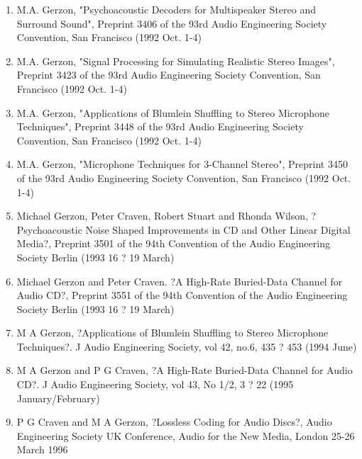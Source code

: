 \documentclass[9pt]{amsart}
\begin{document}
\begin{enumerate}
\item M.A. Gerzon, "Psychoacoustic Decoders for Multispeaker Stereo and Surround Sound", Preprint 3406 of the 93rd Audio Engineering Society Convention, San Francisco (1992 Oct. 1-4)
\item M.A. Gerzon, "Signal Processing for Simulating Realistic Stereo Images", Preprint 3423 of the 93rd Audio Engineering Society Convention, San Francisco (1992 Oct. 1-4)
\item M.A. Gerzon, "Applications of Blumlein Shuffling to Stereo Microphone Techniques", Preprint 3448 of the 93rd Audio Engineering Society Convention, San Francisco (1992 Oct. 1-4)
\item M.A. Gerzon, "Microphone Techniques for 3-Channel Stereo", Preprint 3450 of the 93rd Audio Engineering Society Convention, San Francisco (1992 Oct. 1-4)
\item Michael Gerzon, Peter Craven, Robert Stuart and Rhonda Wilson, ?Psychoacoustic Noise Shaped Improvements in CD and Other Linear Digital Media?, Preprint 3501 of the 94th Convention of the Audio Engineering Society Berlin (1993 16 ? 19 March)
\item Michael Gerzon and Peter Craven. ?A High-Rate Buried-Data Channel for Audio CD?, Preprint 3551 of the 94th Convention of the Audio Engineering Society Berlin (1993 16 ? 19 March)
\item M A Gerzon, ?Applications of Blumlein Shuffling to Stereo Microphone Techniques?. J Audio Engineering Society, vol 42, no.6, 435 ? 453 (1994 June)
\item M A Gerzon and P G Craven, ?A High-Rate Buried-Data Channel for Audio CD?. J Audio Engineering Society, vol 43, No 1/2, 3 ? 22 (1995 January/February)
\item P G Craven and M A Gerzon, ?Lossless Coding for Audio Discs?, Audio Engineering Society UK Conference, Audio for the New Media, London 25-26 March 1996
\end{enumerate}
\end{document}
